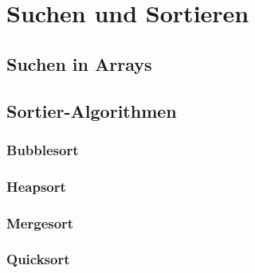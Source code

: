 \section{Suchen und Sortieren}

\subsection{Suchen in Arrays}

\subsection{Sortier-Algorithmen}

\subsubsection{Bubblesort}


    \label{alg:Bubblesort}




\subsubsection{Heapsort}

\label{alg:Heapsort}



\subsubsection{Mergesort}
\label{alg:Mergesort}



\subsubsection{Quicksort}
\label{alg:Quicksort}



